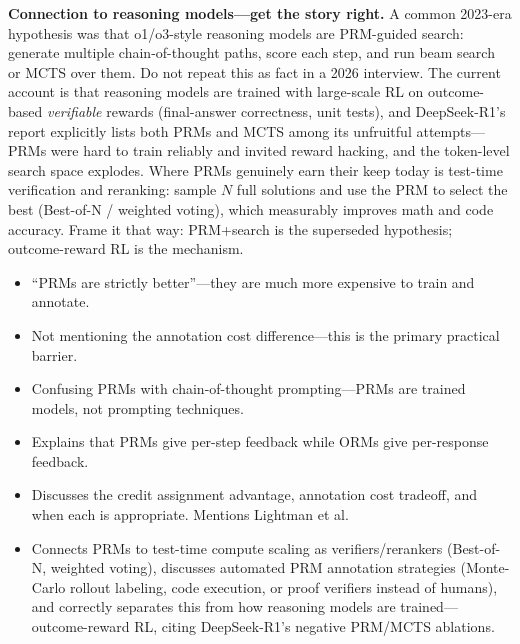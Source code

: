 \begin{interviewq}
\textbf{Connection to reasoning models---get the story right.} A common 2023-era hypothesis was that o1/o3-style reasoning models are PRM-guided search: generate multiple chain-of-thought paths, score each step, and run beam search or MCTS over them. Do not repeat this as fact in a 2026 interview. The current account is that reasoning models are trained with large-scale RL on outcome-based \textit{verifiable} rewards (final-answer correctness, unit tests), and DeepSeek-R1's report explicitly lists both PRMs and MCTS among its unfruitful attempts---PRMs were hard to train reliably and invited reward hacking, and the token-level search space explodes. Where PRMs genuinely earn their keep today is test-time verification and reranking: sample $N$ full solutions and use the PRM to select the best (Best-of-N / weighted voting), which measurably improves math and code accuracy. Frame it that way: PRM+search is the superseded hypothesis; outcome-reward RL is the mechanism.

\redflags
\begin{itemize}
    \item ``PRMs are strictly better''---they are much more expensive to train and annotate.
    \item Not mentioning the annotation cost difference---this is the primary practical barrier.
    \item Confusing PRMs with chain-of-thought prompting---PRMs are trained models, not prompting techniques.
\end{itemize}


\goodgreat
\begin{itemize}
    \item {} Explains that PRMs give per-step feedback while ORMs give per-response feedback.
    \item {} Discusses the credit assignment advantage, annotation cost tradeoff, and when each is appropriate. Mentions Lightman et al.
    \item {} Connects PRMs to test-time compute scaling as verifiers/rerankers (Best-of-N, weighted voting), discusses automated PRM annotation strategies (Monte-Carlo rollout labeling, code execution, or proof verifiers instead of humans), and correctly separates this from how reasoning models are trained---outcome-reward RL, citing DeepSeek-R1's negative PRM/MCTS ablations.
\end{itemize}

\end{interviewq}

